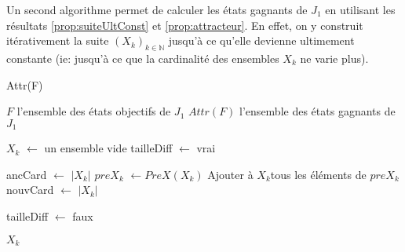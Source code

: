 Un second algorithme permet de calculer les états gagnants de $J_{1}$ en utilisant les résultats \ref{prop:suiteUltConst} et \ref{prop:attracteur}. En effet, on y construit itérativement la suite $(X_{k})_{k \in \mathbb{N}}$ jusqu'à ce qu'elle devienne ultimement constante (ie: jusqu'à ce que la cardinalité des ensembles $X_{k}$ ne varie plus).

\begin{algorithm}
	\caption{Attr(F)}
	\begin{algorithmic}[1]
		\REQUIRE $F$ l'ensemble des états objectifs de $J_{1}$
		\ENSURE $Attr(F)$ l'ensemble des états gagnants de $J_{1}$
		
		\STATE $X_{k}$ $\leftarrow$ un ensemble vide
		\STATE tailleDiff $\leftarrow$ vrai
		
			\STATE ancCard $\leftarrow$ $|X_{k}|$
			\STATE $preX_{k}$ $\leftarrow PreX(X_{k})$
			\STATE Ajouter à $X_{k}$tous les éléments de $preX_{k}$
			\STATE nouvCard $\leftarrow$ $|X_{k}|$
			
				\STATE tailleDiff $\leftarrow$ faux
			\ENDIF
		\ENDWHILE
		
		\RETURN $X_{k}$
\end{algorithmic}
\end{algorithm}

\clearpage


